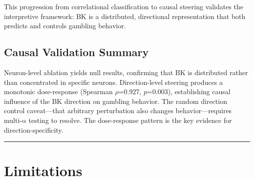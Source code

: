 \documentclass[11pt,a4paper]{article}
\begin{document}
This progression from correlational classification to causal steering validates the interpretive framework: BK is a distributed, directional representation that both predicts and controls gambling behavior.

\subsection{Causal Validation Summary}

Neuron-level ablation yields null results, confirming that BK is distributed rather than concentrated in specific neurons. Direction-level steering produces a monotonic dose-response (Spearman $\rho$=0.927, $p$=0.003), establishing causal influence of the BK direction on gambling behavior. The random direction control caveat---that arbitrary perturbation also changes behavior---requires multi-$\alpha$ testing to resolve. The dose-response pattern is the key evidence for direction-specificity.

\bigskip\hrule\bigskip

\section{Limitations}
\end{document}
